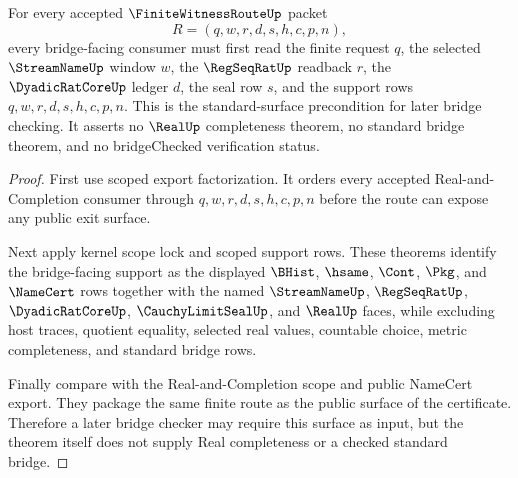 \begin{theorem}
\label{thm:finite-witness-route-bridged-standard-surface}
For every accepted $\FiniteWitnessRouteUp$ packet
$$
R=(q,w,r,d,s,h,c,p,n),
$$
every bridge-facing consumer must first read the finite request $q$, the selected $\StreamNameUp$ window $w$, the $\RegSeqRatUp$ readback $r$, the $\DyadicRatCoreUp$ ledger $d$, the seal row $s$, and the support rows $q,w,r,d,s,h,c,p,n$. This is the standard-surface precondition for later bridge checking. It asserts no $\RealUp$ completeness theorem, no standard bridge theorem, and no bridgeChecked verification status.
\end{theorem}
\begin{proof}
First use scoped export factorization. It orders every accepted Real-and-Completion consumer through $q,w,r,d,s,h,c,p,n$ before the route can expose any public exit surface.

Next apply kernel scope lock and scoped support rows. These theorems identify the bridge-facing support as the displayed $\BHist$, $\hsame$, $\Cont$, $\Pkg$, and $\NameCert$ rows together with the named $\StreamNameUp$, $\RegSeqRatUp$, $\DyadicRatCoreUp$, $\CauchyLimitSealUp$, and $\RealUp$ faces, while excluding host traces, quotient equality, selected real values, countable choice, metric completeness, and standard bridge rows.

Finally compare with the Real-and-Completion scope and public NameCert export. They package the same finite route as the public surface of the certificate. Therefore a later bridge checker may require this surface as input, but the theorem itself does not supply Real completeness or a checked standard bridge.
\end{proof}

